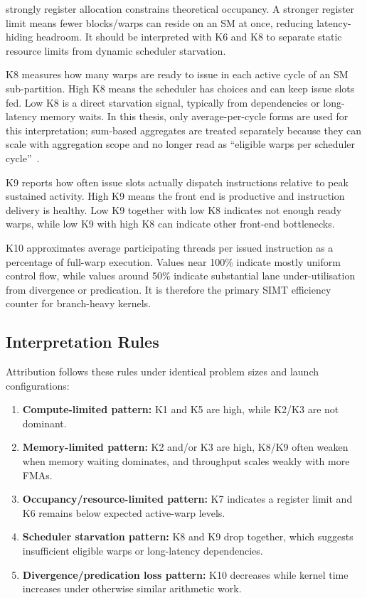 \begin{description}
  strongly register allocation constrains theoretical occupancy. A stronger
  register limit means fewer blocks/warps can reside on an SM at once, reducing
  latency-hiding headroom. It should be interpreted with K6 and K8 to separate
  static resource limits from dynamic scheduler starvation.
  \item[K8 (warps eligible per cycle).] K8 measures how many warps
  are ready to issue in each active cycle of an SM sub-partition. High K8 means
  the scheduler has choices and can keep issue slots fed. Low K8 is a direct
  starvation signal, typically from dependencies or long-latency memory waits.
  In this thesis, only average-per-cycle forms are used for this
  interpretation; sum-based aggregates are treated separately because they can
  scale with aggregation scope and no longer read as ``eligible warps per
  scheduler cycle''~\cite{nvidia-nsight-compute-cli}.
  \item[K9 (issue active).] K9 reports how often issue slots actually
  dispatch instructions relative to peak sustained activity. High K9 means the
  front end is productive and instruction delivery is healthy. Low K9 together
  with low K8 indicates not enough ready warps, while low K9 with high K8 can
  indicate other front-end bottlenecks.
  \item[K10 (thread-inst per inst).] K10 approximates average participating
  threads per issued instruction as a percentage of full-warp execution. Values
  near 100\% indicate mostly uniform control flow, while values around 50\%
  indicate substantial lane under-utilisation from divergence or predication.
  It is therefore the primary SIMT efficiency counter for branch-heavy kernels.
\end{description}

\subsection{Interpretation Rules}

Attribution follows these rules under identical problem sizes and launch
configurations:

\begin{enumerate}
  \item \textbf{Compute-limited pattern:} K1 and K5 are high, while K2/K3 are
  not dominant.
  \item \textbf{Memory-limited pattern:} K2 and/or K3 are high, K8/K9 often
  weaken when memory waiting dominates, and throughput scales weakly with more
  FMAs.
  \item \textbf{Occupancy/resource-limited pattern:} K7 indicates a register
  limit and K6 remains below expected active-warp levels.
  \item \textbf{Scheduler starvation pattern:} K8 and K9 drop together, which
  suggests insufficient eligible warps or long-latency dependencies.
  \item \textbf{Divergence/predication loss pattern:} K10 decreases while kernel
  time increases under otherwise similar arithmetic work.
\end{enumerate}

